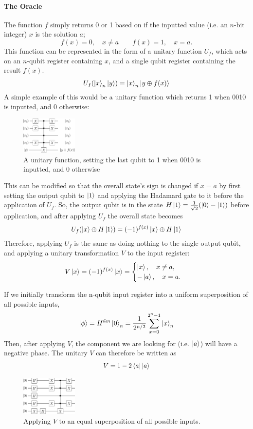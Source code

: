 \documentclass[a4paper,11pt, titlepage, twoside]{article}
\begin{document}
\paragraph{The Oracle}
The function $f$ simply returns 0 or 1 based on if the inputted value (i.e. an $n$-bit integer) $x$ is the solution $a$;
$$f(x) = 0, \quad x \neq a \qquad f(x) = 1, \quad x = a.$$
This function can be represented in the form of a unitary function $U_f$, which acts on an $n$-qubit register containing $x$, and a single qubit register containing the result $f(x)$.
$$U_f(\ket{x}_n\ket{y}) = \ket{x}_n\ket{y \oplus f(x)}$$
A simple example of this would be a unitary function which returns 1 when 0010 is inputted, and 0 otherwise:
\begin{figure}[H]
	\centering
	\includegraphics[width=0.25\textwidth]{oracle0010}
	\caption{A unitary function, setting the last qubit to 1 when 0010 is inputted, and 0 otherwise}
\end{figure}

This can be modified so that the overall state's sign is changed if $x = a$ by first setting the output qubit to $\ket{1}$ and applying the Hadamard gate to it before the application of $U_f$. So, the output qubit is in the state $H\ket{1} = \frac{1}{\sqrt{2}}(\ket{0} - \ket{1})$ before application, and after applying $U_f$ the overall state becomes
$$U_f(\ket{x} \oplus H\ket{1}) = (-1)^{f(x)}\ket{x} \oplus H\ket{1}$$
Therefore, applying $U_f$ is the same as doing nothing to the single output qubit, and applying a unitary transformation $V$ to the input register:
\begin{equation}
	V\ket{x} = (-1)^{f(x)}\ket{x} = \begin{cases}
		\ket{x}, \quad x \neq a,\\
		-\ket{a}, \quad x = a.
	\end{cases}
\end{equation}

If we initially transform the n-qubit input register into a uniform superposition of all possible inputs,
$$\ket{\phi} = H^{\oplus n}\ket{0}_n = \frac{1}{2^{n/2}}\sum_{x=0}^{2^n-1}\ket{x}_n$$
Then, after applying $V$, the component we are looking for (i.e. $\ket{a}$) will have a negative phase. The unitary $V$ can therefore be written as
$$V = 1 - 2\bra{a}\ket{a}$$
\begin{figure}[H]
	\centering
	\includegraphics[width=0.25\textwidth]{oracle00102}
	\caption{Applying $V$ to an equal superposition of all possible inputs.}
\end{figure}
\end{document}
